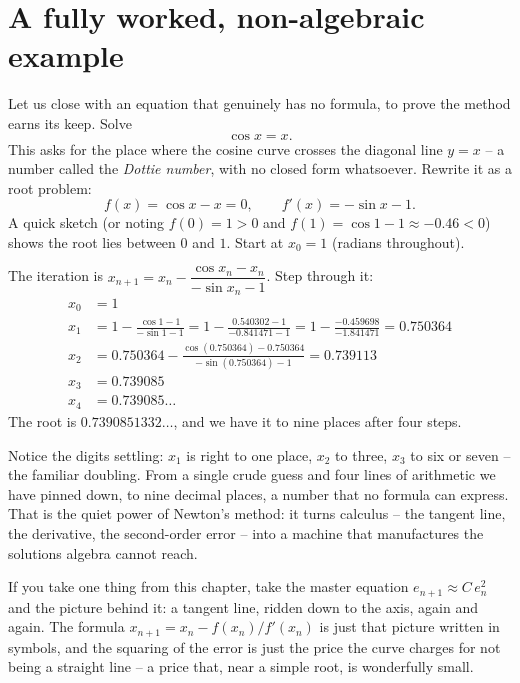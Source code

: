 \section{A fully worked, non-algebraic example}
\label{ch19:full-example}

Let us close with an equation that genuinely has no formula, to prove the method
earns its keep. Solve
\[
  \cos x = x.
\]
This asks for the place where the cosine curve crosses the diagonal line $y = x$ --
a number called the \emph{Dottie number}, with no closed form whatsoever. Rewrite it
as a root problem:
\[
  f(x) = \cos x - x = 0, \qquad f'(x) = -\sin x - 1.
\]
A quick sketch (or noting $f(0) = 1 > 0$ and $f(1) = \cos 1 - 1 \approx -0.46 < 0$)
shows the root lies between $0$ and $1$. Start at $x_0 = 1$ (radians throughout).

\begin{labbox}
The iteration is $x_{n+1} = x_n - \dfrac{\cos x_n - x_n}{-\sin x_n - 1}$. Step
through it:
\begin{align*}
  x_0 &= 1 \\
  x_1 &= 1 - \frac{\cos 1 - 1}{-\sin 1 - 1}
       = 1 - \frac{0.540302 - 1}{-0.841471 - 1}
       = 1 - \frac{-0.459698}{-1.841471}
       = 0.750364 \\
  x_2 &= 0.750364 - \frac{\cos(0.750364) - 0.750364}{-\sin(0.750364) - 1}
       = 0.739113 \\
  x_3 &= 0.739085 \\
  x_4 &= 0.739085\ldots
\end{align*}
The root is $0.7390851332\ldots$, and we have it to nine places after four steps.
\end{labbox}

Notice the digits settling: $x_1$ is right to one place, $x_2$ to three, $x_3$ to
six or seven -- the familiar doubling. From a single crude guess and four lines of
arithmetic we have pinned down, to nine decimal places, a number that no formula can
express. That is the quiet power of Newton's method: it turns calculus -- the
tangent line, the derivative, the second-order error -- into a machine that
manufactures the solutions algebra cannot reach.

\begin{recoverybox}
If you take one thing from this chapter, take the master equation $e_{n+1} \approx
C\, e_n^2$ and the picture behind it: a tangent line, ridden down to the axis, again
and again. The formula $x_{n+1} = x_n - f(x_n)/f'(x_n)$ is just that picture written
in symbols, and the squaring of the error is just the price the curve charges for
not being a straight line -- a price that, near a simple root, is wonderfully small.
\end{recoverybox}

